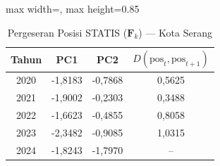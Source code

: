\begin{table}[H]
\centering
\caption{Pergeseran Posisi STATIS ($\mathbf{F}_k$) --- Kota Serang} \label{tab:app1jarak_statis_skor_kota_serang}
\begin{adjustbox}{max width=\textwidth, max height=0.85\textheight}
\begin{tabular}{|c|c|c|c|}
\hline
\textbf{Tahun} & \textbf{PC1} & \textbf{PC2} & \textbf{$D(\text{pos}_t, \text{pos}_{t+1})$} \\
\hline
2020 & -1,8183 & -0,7868 & 0,5625 \\
2021 & -1,9002 & -0,2303 & 0,3488 \\
2022 & -1,6623 & -0,4855 & 0,8058 \\
2023 & -2,3482 & -0,9085 & 1,0315 \\
2024 & -1,8243 & -1,7970 & -- \\
\hline
\end{tabular}
\end{adjustbox}
\end{table}